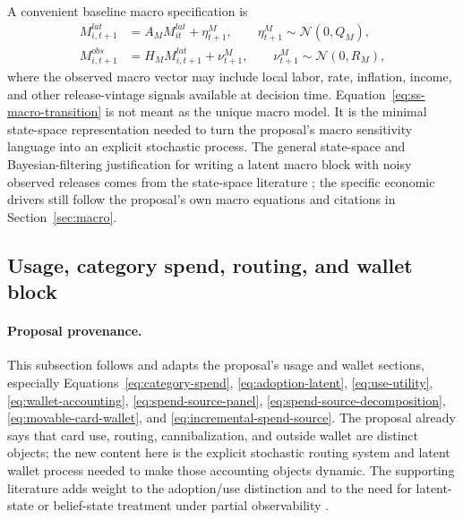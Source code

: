 \documentclass[11pt]{article}
\newcommand{\1}{\mathbf{1}}
\begin{document}
A convenient baseline macro specification is
\begin{align}
  M^{lat}_{i,t+1}
    &= A_M M^{lat}_{it} + \eta^{M}_{t+1},
       \qquad \eta^{M}_{t+1}\sim\mathcal{N}(0,Q_M),
       \label{eq:ss-macro-transition}\\
  M^{obs}_{i,t+1}
    &= H_M M^{lat}_{i,t+1} + \nu^{M}_{t+1},
       \qquad \nu^{M}_{t+1}\sim\mathcal{N}(0,R_M),
       \label{eq:ss-macro-observation}
\end{align}
where the observed macro vector may include local labor, rate, inflation,
income, and other release-vintage signals available at decision time.
Equation~\eqref{eq:ss-macro-transition} is not meant as the unique macro model.
It is the minimal state-space representation needed to turn the proposal's macro
sensitivity language into an explicit stochastic process. The general state-space
and Bayesian-filtering justification for writing a latent macro block with noisy
observed releases comes from the state-space literature
\citep{durbinkoopman2012ssm,westharrison1997bfdm}; the specific economic drivers
still follow the proposal's own macro equations and citations in
Section~\ref{sec:macro}.

\subsection{Usage, category spend, routing, and wallet block}
\label{subsec:state-space-usage-wallet}

\paragraph{Proposal provenance.}
This subsection follows and adapts the proposal's usage and wallet sections,
especially Equations~\eqref{eq:category-spend},
\eqref{eq:adoption-latent}, \eqref{eq:use-utility},
\eqref{eq:wallet-accounting}, \eqref{eq:spend-source-panel},
\eqref{eq:spend-source-decomposition}, \eqref{eq:movable-card-wallet}, and
\eqref{eq:incremental-spend-source}. The proposal already says that card use,
routing, cannibalization, and outside wallet are distinct objects; the new
content here is the explicit stochastic routing system and latent wallet process
needed to make those accounting objects dynamic. The supporting literature adds
weight to the adoption/use distinction and to the need for latent-state or
belief-state treatment under partial observability
\citep{koulayev2012payment,agarwal2010rewards,prelec2001creditcard,
smallwood1973pomdp,kaelbling1998pomdp}.
\end{document}
